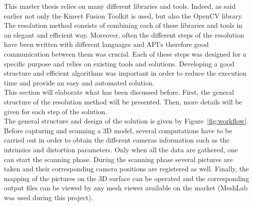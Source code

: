 This master thesis relies on many different libraries and tools. Indeed, as said earlier not only the Kinect Fusion Toolkit is used, but also the OpenCV library. The resolution method consists of combining each of these libraries and tools in an elegant and efficient way. Moreover, often the different steps of the resolution have been written with different languages and API's therefore good communication between them was crucial. Each of these steps was designed for a specific purpose and relies on existing tools and solutions. Developing a good structure and efficient algorithms was important in order to reduce the execution time and provide an easy and automated solution.\\

This section will elaborate what has been discussed before. First, the general structure of the resolution method will be presented. Then, more details will be given for each step of the solution.\\

The general structure and design of the solution is given by Figure~\ref{fig:workflow}. Before capturing and scanning a 3D model, several computations have to be carried out in order to obtain the different cameras information such as the intrinsics and distortion parameters. Only when all the data are gathered, one can start the scanning phase. During the scanning phase several pictures are taken and their corresponding camera positions are registered as well. Finally, the mapping of the pictures on the 3D surface can be operated and the corresponding output files can be viewed by any mesh viewer available on the market (MeshLab was used during this project).\\

